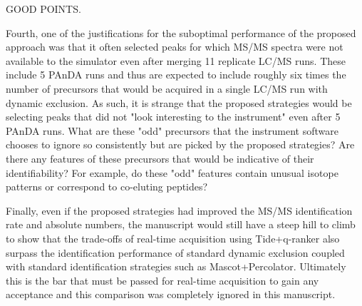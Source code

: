 GOOD POINTS.

Fourth, one of the justifications for the suboptimal performance of
the proposed approach was that it often selected peaks for which
MS/MS spectra were not available to the simulator even after
merging 11 replicate LC/MS runs. These include 5 PAnDA runs and
thus are expected to include roughly six times the number of
precursors that would be acquired in a single LC/MS run with
dynamic exclusion. As such, it is strange that the proposed
strategies would be selecting peaks that did not "look interesting
to the instrument" even after 5 PAnDA runs. What are these "odd"
precursors that the instrument software chooses to ignore so
consistently but are picked by the proposed strategies? Are there
any features of these precursors that would be indicative of their
identifiability? For example, do these "odd" features contain
unusual isotope patterns or correspond to co-eluting peptides?

Finally, even if the proposed strategies had improved the MS/MS
identification rate and absolute numbers, the manuscript would
still have a steep hill to climb to show that the trade-offs of
real-time acquisition using Tide+q-ranker also surpass the
identification performance of standard dynamic exclusion coupled
with standard identification strategies such as Mascot+Percolator.
Ultimately this is the bar that must be passed for real-time
acquisition to gain any acceptance and this comparison was
completely ignored in this manuscript.
